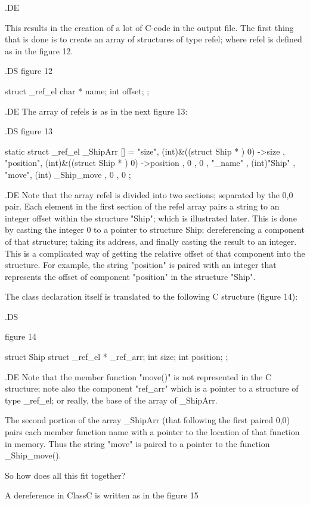 .DE

This results in the creation of a lot of C-code in the output file.
The first thing that is done is to create an array of structures
of type refel; where refel is defined as in the figure 12.

.DS
figure 12


struct _ref_el
    {
	char * name; 
	int offset; 
    };


.DE
The array of refels is as in the next figure 13:

.DS
figure 13

static struct _ref_el _ShipArr [] =
    { 
	{ "size",	(int)&((struct Ship * ) 0) ->size },
	{ "position",	(int)&((struct Ship * ) 0) ->position },
	{ 0 , 0 },
	{ "_name" , (int)"Ship" },
	{ "move",	(int) _Ship_move },
	{  0 , 0 }
    };	


.DE
Note that the array refel is divided into two sections; separated by the
0,0 pair.  Each element in the first section of the refel array pairs
a string to an integer offset within the structure "Ship"; which is
illustrated later.  This is done by casting the integer 0 to a pointer to
structure Ship; dereferencing a component of that structure; taking its
address, and finally casting the result to an integer.  This is a
complicated way of getting the relative offset of that component
into the structure.  For example, the string "position" is paired with
an integer that represents the offset of component "position" in the 
structure "Ship".

The class declaration itself is translated to the
following C structure (figure 14):

.DS

figure 14

struct Ship
    {
	struct _ref_el * _ref_arr;
	int	size;
	int	position;
    }	;



.DE
Note that the member function "move()" is not represented in the 
C structure; note also the component "ref_arr" which is a pointer
to a structure of type _ref_el; or really, the base of the array of
_ShipArr.


The second portion of the array _ShipArr (that following the first
paired {0,0}) pairs each member function name with a pointer to the
location of that function in memory.  Thus the string "move" is
paired to a pointer to the function _Ship_move().

So how does all this fit together?

A dereference in ClassC is written as in the figure 15

